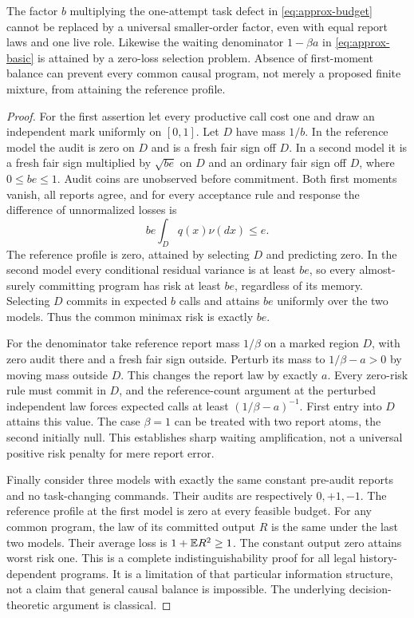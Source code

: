 \begin{proposition}\label{prop:sharp-approx}
The factor $b$ multiplying the one-attempt task defect in \eqref{eq:approx-budget} cannot be replaced by a universal smaller-order factor, even with equal report laws and one live role. Likewise the waiting denominator $1-\beta a$ in \eqref{eq:approx-basic} is attained by a zero-loss selection problem. Absence of first-moment balance can prevent every common causal program, not merely a proposed finite mixture, from attaining the reference profile.
\end{proposition}
\begin{proof}
For the first assertion let every productive call cost one and draw an independent mark uniformly on $[0,1]$. Let $D$ have mass $1/b$. In the reference model the audit is zero on $D$ and is a fresh fair sign off $D$. In a second model it is a fresh fair sign multiplied by $\sqrt{be}$ on $D$ and an ordinary fair sign off $D$, where $0\le be\le1$. Audit coins are unobserved before commitment. Both first moments vanish, all reports agree, and for every acceptance rule and response the difference of unnormalized losses is
\[
 be\int_D q(x)\nu(dx)\le e.
\]
The reference profile is zero, attained by selecting $D$ and predicting zero. In the second model every conditional residual variance is at least $be$, so every almost-surely committing program has risk at least $be$, regardless of its memory. Selecting $D$ commits in expected $b$ calls and attains $be$ uniformly over the two models. Thus the common minimax risk is exactly $be$.

For the denominator take reference report mass $1/\beta$ on a marked region $D$, with zero audit there and a fresh fair sign outside. Perturb its mass to $1/\beta-a>0$ by moving mass outside $D$. This changes the report law by exactly $a$. Every zero-risk rule must commit in $D$, and the reference-count argument at the perturbed independent law forces expected calls at least $(1/\beta-a)^{-1}$. First entry into $D$ attains this value. The case $\beta=1$ can be treated with two report atoms, the second initially null. This establishes sharp waiting amplification, not a universal positive risk penalty for mere report error.

Finally consider three models with exactly the same constant pre-audit reports and no task-changing commands. Their audits are respectively $0,+1,-1$. The reference profile at the first model is zero at every feasible budget. For any common program, the law of its committed output $R$ is the same under the last two models. Their average loss is $1+\mathbb E R^2\ge1$. The constant output zero attains worst risk one. This is a complete indistinguishability proof for all legal history-dependent programs. It is a limitation of that particular information structure, not a claim that general causal balance is impossible. The underlying decision-theoretic argument is classical.
\end{proof}
